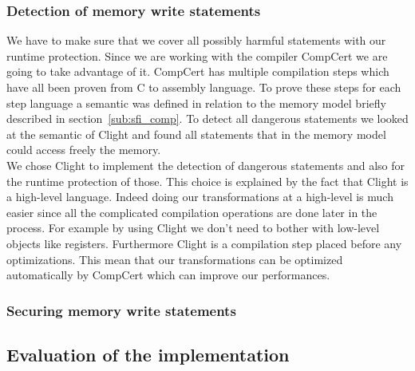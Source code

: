 \documentclass[11pt]{sdm}
\begin{document}
\subsubsection{Detection of memory write statements}
\label{ssub:Detection of memory write statements}
We have to make sure that we cover all possibly harmful statements with our runtime protection. Since we are working with the compiler CompCert we are going to take advantage of it. CompCert has multiple compilation steps which have all been proven from C to assembly language. To prove these steps for each step language a semantic was defined in relation to the memory model briefly described in section~\ref{sub:sfi_comp}.
To detect all dangerous statements we looked at the semantic of Clight and found all statements that in the memory model could access freely the memory.\\
We chose Clight to implement the detection of dangerous statements and also for the runtime protection of those. This choice is explained by the fact that Clight is a high-level language. 
Indeed doing our transformations at a high-level is much easier since all the complicated compilation operations are done later in the process. For example by using Clight we don't need to bother with low-level objects like registers. Furthermore Clight is a compilation step placed before any optimizations. This mean that our transformations can be optimized automatically by CompCert which can improve our performances.

\subsubsection{Securing memory write statements}
\label{ssub:implem_check_address}

\subsection{Evaluation of the implementation}
\label{sub:Evaluation of the implementation}
\end{document}
